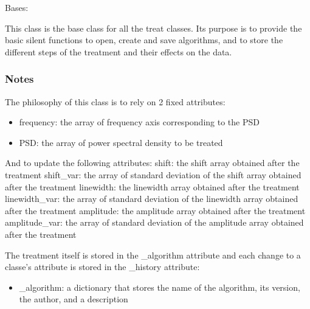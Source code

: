 \documentclass[letterpaper,10pt,english]{sphinxmanual}
\begin{document}
\begin{fulllineitems}
\label{\detokenize{source/_autosummary/HDF5_BLS_treat.Treat_backend:HDF5_BLS_treat.Treat_backend}}
\pysigstartsignatures
\pysiglinewithargsret
{}
{\sphinxparamcomma {}\sphinxparamcomma {}}
{}
\pysigstopsignatures
\sphinxAtStartPar
Bases: 

\sphinxAtStartPar
This class is the base class for all the treat classes. Its purpose is to provide the basic silent functions to open, create and save algorithms, and to store the different steps of the treatment and their effects on the data.
\subsubsection*{Notes}

\sphinxAtStartPar
The philosophy of this class is to rely on 2 fixed attributes:
\begin{itemize}
\item {} 
\sphinxAtStartPar
frequency: the array of frequency axis corresponding to the PSD

\item {} 
\sphinxAtStartPar
PSD: the array of power spectral density to be treated

\end{itemize}

\sphinxAtStartPar
And to update the following attributes:
\sphinxhyphen{} shift: the shift array obtained after the treatment
\sphinxhyphen{} shift\_var: the array of standard deviation of the shift array obtained after the treatment
\sphinxhyphen{} linewidth: the linewidth array obtained after the treatment
\sphinxhyphen{} linewidth\_var: the array of standard deviation of the linewidth array obtained after the treatment
\sphinxhyphen{} amplitude: the amplitude array obtained after the treatment
\sphinxhyphen{} amplitude\_var: the array of standard deviation of the amplitude array obtained after the treatment

\sphinxAtStartPar
The treatment itself is stored in the \_algorithm attribute and each change to a classe’s attribute is stored in the \_history attribute:
\begin{itemize}
\item {} 
\sphinxAtStartPar
\_algorithm: a dictionary that stores the name of the algorithm, its version, the author, and a description


\end{itemize}
\end{fulllineitems}
\end{document}
